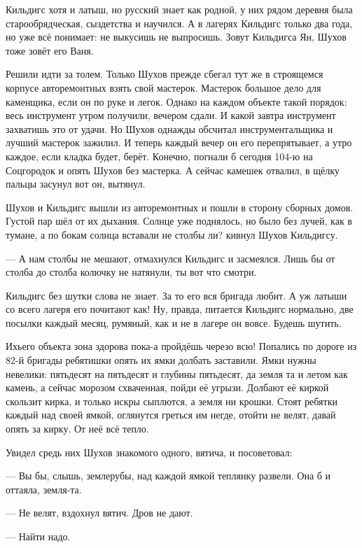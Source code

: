 Кильдигс хотя и латыш, но русский знает как родной, \dash у них рядом деревня была
старообрядческая, сыздетства и научился. А в лагерях Кильдигс только два года, но уже всё
понимает: не выкусишь \dash не выпросишь. Зовут Кильдигса Ян, Шухов тоже зовёт его Ваня.

Решили идти за толем. Только Шухов прежде сбегал тут же в строящемся корпусе авторемонтных
взять свой мастерок. Мастерок \dash большое дело для каменщика, если он по руке и легок. Однако
на каждом объекте такой порядок: весь инструмент утром получили, вечером сдали. И какой
завтра инструмент захватишь \dash это от удачи. Но Шухов однажды обсчитал инструментальщика и
лучший мастерок зажилил. И теперь каждый вечер он его перепрятывает, а утро каждое, если
кладка будет, берёт. Конечно, погнали б сегодня 104-ю на Соцгородок \dash и опять Шухов без
мастерка. А сейчас камешек отвалил, в щёлку пальцы засунул \dash вот он, вытянул.

Шухов и Кильдигс вышли из авторемонтных и пошли в сторону сборных домов. Густой пар шёл от их
дыхания. Солнце уже поднялось, но было без лучей, как в тумане, а по бокам солнца вставали \Dash
не столбы ли? \dash кивнул Шухов Кильдигсу.

--- А нам столбы не мешают, \dash отмахнулся Кильдигс и засмеялся. \Dash Лишь бы от столба до столба
колючку не натянули, ты вот что смотри.

Кильдигс без шутки слова не знает. За то его вся бригада любит. А уж латыши со всего лагеря
его почитают как! Ну, правда, питается Кильдигс нормально, две посылки каждый месяц, румяный,
как и не в лагере он вовсе. Будешь шутить.

Ихьего объекта зона здорова \dash пока-а пройдёшь черезо всю! Попались по дороге из 82-й бригады
ребятишки \dash опять их ямки долбать заставили. Ямки нужны невелики: пятьдесят на пятьдесят и
глубины пятьдесят, да земля та и летом как камень, а сейчас морозом схваченная, пойди её
угрызи. Долбают её киркой \dash скользит кирка, и только искры сыплются, а земля \dash ни крошки.
Стоят ребятки каждый над своей ямкой, оглянутся \dash греться им негде, отойти не велят, \dash давай
опять за кирку. От неё всё тепло.

Увидел средь них Шухов знакомого одного, вятича, и посоветовал:

--- Вы бы, слышь, землерубы, над каждой ямкой теплянку развели. Она б и оттаяла, земля-та.

--- Не велят, \dash вздохнул вятич. \Dash Дров не дают.

--- Найти надо.

